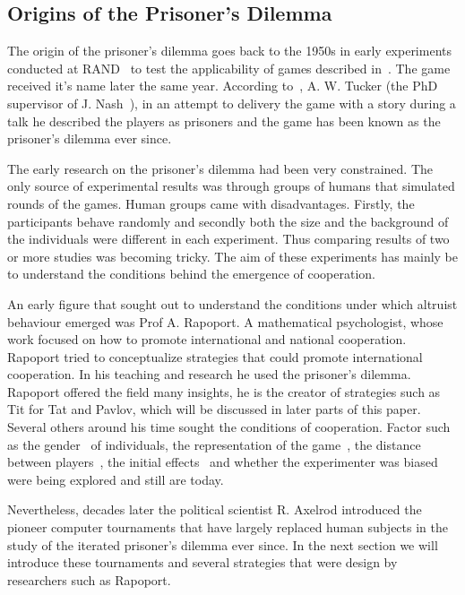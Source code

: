\documentclass{article}
\theoremstyle{definition}
\begin{document}
\subsection{Origins of the Prisoner's Dilemma}\label{section:origin}

The origin of the prisoner's dilemma goes back to the 1950s in early experiments
conducted at RAND~\cite{Flood1958} to test the applicability of games
described in~\cite{VonNeumann1944}. The game received it's name later the same year.
According to~\cite{Tucker1983}, A. W. Tucker (the PhD supervisor of J. Nash~\cite{Nash1951}),
in an attempt to delivery the game with a story during a talk he described the players
as prisoners and the game has been known as the prisoner's dilemma ever since.

The early research on the prisoner's dilemma had been very constrained. The only
source of experimental results was through groups of humans that simulated rounds
of the games. Human groups came with disadvantages. Firstly, the participants
behave randomly and secondly both the size and the background of the
individuals were different in each experiment. Thus comparing results of two or
more studies was becoming tricky. The aim of these experiments has mainly be to
understand the conditions behind the emergence of cooperation.

An early figure that sought out to understand the conditions under which altruist
behaviour emerged was Prof A. Rapoport. A mathematical psychologist, whose work focused on
how to promote international and national cooperation. Rapoport tried to conceptualize
strategies that could promote international cooperation. In his teaching and research
he used the prisoner's dilemma. Rapoport offered the field many insights, he
is the creator of strategies such as Tit for Tat and Pavlov, which will be discussed
in later parts of this paper.
Several others around his time sought the conditions of cooperation. Factor such as
the gender~\cite{Evans1966, Lutzker1961, Mack1971} of
individuals, the representation of the game~\cite{Evans1966}, the distance between
players~\cite{Sensenig1972}, the initial effects~\cite{Tedeschi1968} and whether
the experimenter was biased~\cite{Gallo1968} were being explored and still are
today.

Nevertheless, decades later the political scientist R. Axelrod introduced the 
pioneer computer tournaments that have largely replaced human subjects in the study
of the iterated prisoner's dilemma ever since. In the next section we will
introduce these tournaments and several strategies that were design by researchers
such as Rapoport.
\end{document}

